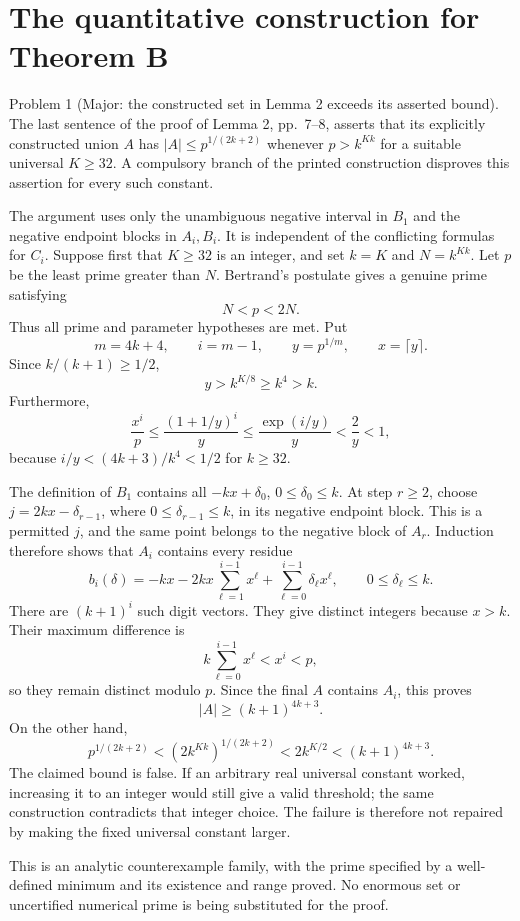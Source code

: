 \documentclass[10pt]{article}
\begin{document}
\section*{The quantitative construction for Theorem B}
Problem 1 (Major: the constructed set in Lemma 2 exceeds its asserted bound).  The last sentence of the proof of Lemma 2, pp. 7–8, asserts that its explicitly constructed union \(A\) has \(|A|\le p^{1/(2k+2)}\) whenever \(p>k^{Kk}\) for a suitable universal \(K\ge32\). A compulsory branch of the printed construction disproves this assertion for every such constant.\par
The argument uses only the unambiguous negative interval in \(B_1\) and the negative endpoint blocks in \(A_i,B_i\). It is independent of the conflicting formulas for \(C_i\). Suppose first that \(K\ge32\) is an integer, and set \(k=K\) and \(N=k^{Kk}\). Let \(p\) be the least prime greater than \(N\). Bertrand’s postulate gives a genuine prime satisfying \[N<p<2N.\] Thus all prime and parameter hypotheses are met. Put \[m=4k+4,\qquad i=m-1,\qquad
 y=p^{1/m},\qquad x=\lceil y\rceil.\] Since \(k/(k+1)\ge1/2\), \[y>k^{K/8}\ge k^4>k.\] Furthermore, \[\frac{x^i}{p}
 \le \frac{(1+1/y)^i}{y}
 \le \frac{\exp(i/y)}{y}
 <\frac2y<1,\] because \(i/y<(4k+3)/k^4<1/2\) for \(k\ge32\).\par
The definition of \(B_1\) contains all \(-kx+\delta_0\), \(0\le\delta_0\le k\). At step \(r\ge2\), choose \(j=2kx-\delta_{r-1}\), where \(0\le\delta_{r-1}\le k\), in its negative endpoint block. This is a permitted \(j\), and the same point belongs to the negative block of \(A_r\). Induction therefore shows that \(A_i\) contains every residue \[b_i(\delta)=
 -kx-2kx\sum_{\ell=1}^{i-1}x^\ell
       +\sum_{\ell=0}^{i-1}\delta_\ell x^\ell,
 \qquad 0\le\delta_\ell\le k.\] There are \((k+1)^i\) such digit vectors. They give distinct integers because \(x>k\). Their maximum difference is \[k\sum_{\ell=0}^{i-1}x^\ell<x^i<p,\] so they remain distinct modulo \(p\). Since the final \(A\) contains \(A_i\), this proves \[|A|\ge(k+1)^{4k+3}.\] On the other hand, \[p^{1/(2k+2)}
 <(2k^{Kk})^{1/(2k+2)}
 <2k^{K/2}
 <(k+1)^{4k+3}.\] The claimed bound is false. If an arbitrary real universal constant worked, increasing it to an integer would still give a valid threshold; the same construction contradicts that integer choice. The failure is therefore not repaired by making the fixed universal constant larger.\par
This is an analytic counterexample family, with the prime specified by a well-defined minimum and its existence and range proved. No enormous set or uncertified numerical prime is being substituted for the proof.\par
\end{document}
